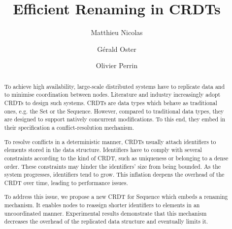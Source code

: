 \documentclass[sigplan,10pt]{acmart}
\begin{document}
\title{Efficient Renaming in \aclp{CRDT}}

\author{Matthieu Nicolas}

\author{Gérald Oster}

\author{Olivier Perrin}

\begin{abstract}
To achieve high availability, large-scale distributed systems have to replicate data and to minimise coordination between nodes.
Literature and industry increasingly adopt \acfp{CRDT} to design such systems.
\acp{CRDT} are data types which behave as traditional ones, e.g. the Set or the Sequence.
However, compared to traditional data types, they are designed to support natively concurrent modifications.
To this end, they embed in their specification a conflict-resolution mechanism.

To resolve conflicts in a deterministic manner, CRDTs usually attach identifiers to elements stored in the data structure.
Identifiers have to comply with several constraints according to the kind of \ac{CRDT}, such as uniqueness or belonging to a dense order.
These constraints may hinder the identifiers’ size from being bounded.
As the system progresses, identifiers tend to grow.
This inflation deepens the overhead of the \ac{CRDT} over time, leading to performance issues.

To address this issue, we propose a new CRDT for Sequence which embeds a renaming mechanism.
It enables nodes to reassign shorter identifiers to elements in an uncoordinated manner.
Experimental results demonstrate that this mechanism decreases the overhead of the replicated data structure and eventually limits it.
\end{abstract}


\maketitle
\end{document}
